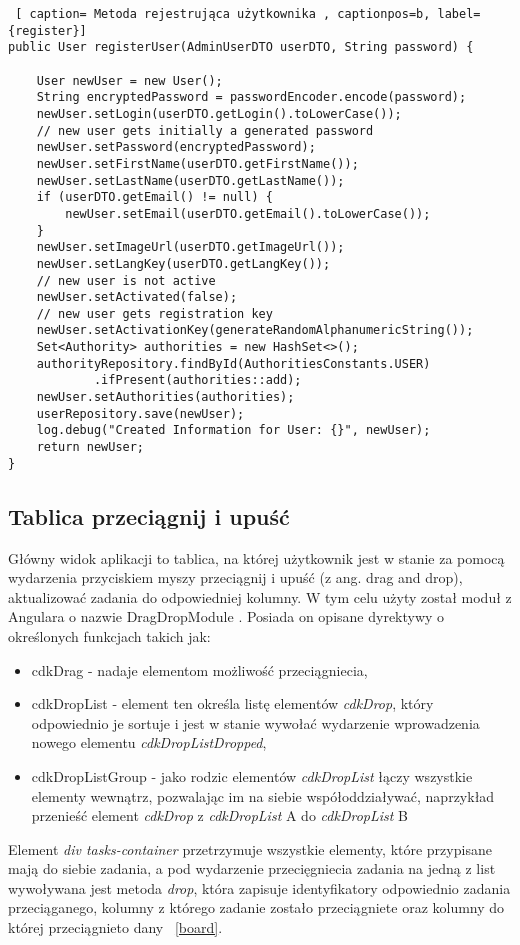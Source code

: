 \clearpage
\begin{lstlisting} [ caption= Metoda rejestrująca użytkownika , captionpos=b, label={register}]
public User registerUser(AdminUserDTO userDTO, String password) {
			
	User newUser = new User();
	String encryptedPassword = passwordEncoder.encode(password);
	newUser.setLogin(userDTO.getLogin().toLowerCase());
	// new user gets initially a generated password
	newUser.setPassword(encryptedPassword);
	newUser.setFirstName(userDTO.getFirstName());
	newUser.setLastName(userDTO.getLastName());
	if (userDTO.getEmail() != null) {
		newUser.setEmail(userDTO.getEmail().toLowerCase());
	}
	newUser.setImageUrl(userDTO.getImageUrl());
	newUser.setLangKey(userDTO.getLangKey());
	// new user is not active
	newUser.setActivated(false);
	// new user gets registration key
	newUser.setActivationKey(generateRandomAlphanumericString());
	Set<Authority> authorities = new HashSet<>();
	authorityRepository.findById(AuthoritiesConstants.USER)
			.ifPresent(authorities::add);
	newUser.setAuthorities(authorities);
	userRepository.save(newUser);
	log.debug("Created Information for User: {}", newUser);
	return newUser;
}
\end{lstlisting}
\subsection{ Tablica przeciągnij i upuść}
Główny widok aplikacji to tablica, na której użytkownik jest w stanie za pomocą wydarzenia przyciskiem myszy przeciągnij i upuść (z ang. drag and drop), aktualizować zadania do odpowiedniej kolumny. W tym celu użyty został moduł z Angulara o nazwie DragDropModule \cite{draganddrop}. Posiada on opisane dyrektywy o określonych funkcjach takich jak:
\begin{itemize}
		\item cdkDrag - nadaje elementom możliwość przeciągniecia,
		\item cdkDropList - element ten określa listę elementów \textit{cdkDrop}, który odpowiednio je sortuje i jest w stanie wywołać wydarzenie wprowadzenia nowego elementu \textit{cdkDropListDropped},
		\item cdkDropListGroup - jako rodzic elementów \textit{cdkDropList} łączy wszystkie elementy wewnątrz, pozwalając im na siebie współoddziaływać, naprzykład przenieść element \textit{cdkDrop}  z \textit{cdkDropList} A do \textit{cdkDropList} B
\end{itemize}
Element \textit{div tasks-container} przetrzymuje wszystkie elementy, które przypisane mają do siebie zadania, a pod wydarzenie przecięgniecia zadania na jedną z list wywoływana jest metoda \textit{drop}, która zapisuje identyfikatory odpowiednio zadania przeciąganego, kolumny z którego zadanie zostało przeciągniete oraz kolumny do której przeciągnieto dany ~\ref{board}.

